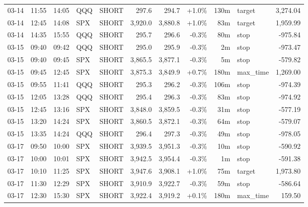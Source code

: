 \documentclass[11pt,a4paper,twoside]{article}
\begin{document}
\begin{center}
\begin{longtable}{>{\color{txtmain}}l l l l l r r r r >{\color{txtmain}}l r}
03-14 & 11:55 & 14:05 & QQQ & SHORT & 297.6 & 294.7 & \textcolor{wingreen}{+1.0\%} & 130m & target & \textcolor{wingreen}{3,274.04} \\
03-14 & 12:45 & 14:08 & SPX & SHORT & 3,920.0 & 3,880.8 & \textcolor{wingreen}{+1.0\%} & 83m & target & \textcolor{wingreen}{1,959.99} \\
03-14 & 14:35 & 15:55 & QQQ & SHORT & 295.7 & 296.6 & \textcolor{lossred}{-0.3\%} & 80m & stop & \textcolor{lossred}{-975.84} \\
03-15 & 09:40 & 09:42 & QQQ & SHORT & 295.0 & 295.9 & \textcolor{lossred}{-0.3\%} & 2m & stop & \textcolor{lossred}{-973.47} \\
03-15 & 09:40 & 09:45 & SPX & SHORT & 3,865.5 & 3,877.1 & \textcolor{lossred}{-0.3\%} & 5m & stop & \textcolor{lossred}{-579.82} \\
03-15 & 09:45 & 12:45 & SPX & SHORT & 3,875.3 & 3,849.9 & \textcolor{wingreen}{+0.7\%} & 180m & max\_time & \textcolor{wingreen}{1,269.00} \\
03-15 & 09:55 & 11:41 & QQQ & SHORT & 295.3 & 296.2 & \textcolor{lossred}{-0.3\%} & 106m & stop & \textcolor{lossred}{-974.39} \\
03-15 & 12:05 & 13:28 & QQQ & SHORT & 295.4 & 296.3 & \textcolor{lossred}{-0.3\%} & 83m & stop & \textcolor{lossred}{-974.92} \\
03-15 & 12:45 & 13:16 & SPX & SHORT & 3,848.0 & 3,859.5 & \textcolor{lossred}{-0.3\%} & 31m & stop & \textcolor{lossred}{-577.19} \\
03-15 & 13:20 & 14:24 & SPX & SHORT & 3,860.5 & 3,872.1 & \textcolor{lossred}{-0.3\%} & 64m & stop & \textcolor{lossred}{-579.07} \\
03-15 & 13:35 & 14:24 & QQQ & SHORT & 296.4 & 297.3 & \textcolor{lossred}{-0.3\%} & 49m & stop & \textcolor{lossred}{-978.05} \\
03-17 & 09:50 & 10:00 & SPX & SHORT & 3,939.5 & 3,951.3 & \textcolor{lossred}{-0.3\%} & 10m & stop & \textcolor{lossred}{-590.92} \\
03-17 & 10:00 & 10:01 & SPX & SHORT & 3,942.5 & 3,954.4 & \textcolor{lossred}{-0.3\%} & 1m & stop & \textcolor{lossred}{-591.38} \\
03-17 & 10:10 & 11:25 & SPX & SHORT & 3,947.6 & 3,908.1 & \textcolor{wingreen}{+1.0\%} & 75m & target & \textcolor{wingreen}{1,973.80} \\
03-17 & 11:30 & 12:29 & SPX & SHORT & 3,910.9 & 3,922.7 & \textcolor{lossred}{-0.3\%} & 59m & stop & \textcolor{lossred}{-586.64} \\
03-17 & 12:30 & 15:30 & SPX & SHORT & 3,922.4 & 3,919.2 & \textcolor{wingreen}{+0.1\%} & 180m & max\_time & \textcolor{wingreen}{159.50} \\

\end{longtable}
\end{center}
\end{document}

